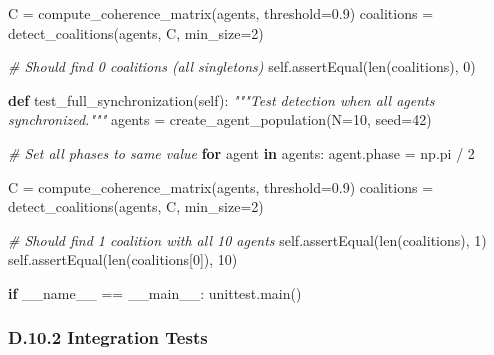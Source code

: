 \documentclass[
]{article}
\newenvironment{Shaded}{}{}
\newcommand{\BuiltInTok}[1]{\textcolor[rgb]{0.00,0.50,0.00}{#1}}
\newcommand{\CommentTok}[1]{\textcolor[rgb]{0.38,0.63,0.69}{\textit{#1}}}
\newcommand{\ControlFlowTok}[1]{\textcolor[rgb]{0.00,0.44,0.13}{\textbf{#1}}}
\newcommand{\DecValTok}[1]{\textcolor[rgb]{0.25,0.63,0.44}{#1}}
\newcommand{\FloatTok}[1]{\textcolor[rgb]{0.25,0.63,0.44}{#1}}
\newcommand{\KeywordTok}[1]{\textcolor[rgb]{0.00,0.44,0.13}{\textbf{#1}}}
\newcommand{\NormalTok}[1]{#1}
\newcommand{\OperatorTok}[1]{\textcolor[rgb]{0.40,0.40,0.40}{#1}}
\newcommand{\StringTok}[1]{\textcolor[rgb]{0.25,0.44,0.63}{#1}}
\newcommand{\VariableTok}[1]{\textcolor[rgb]{0.10,0.09,0.49}{#1}}
\begin{document}
\begin{Shaded}
\begin{Highlighting}[]
\NormalTok{        C }\OperatorTok{=}\NormalTok{ compute\_coherence\_matrix(agents, threshold}\OperatorTok{=}\FloatTok{0.9}\NormalTok{)}
\NormalTok{        coalitions }\OperatorTok{=}\NormalTok{ detect\_coalitions(agents, C, min\_size}\OperatorTok{=}\DecValTok{2}\NormalTok{)}

        \CommentTok{\# Should find 0 coalitions (all singletons)}
        \VariableTok{self}\NormalTok{.assertEqual(}\BuiltInTok{len}\NormalTok{(coalitions), }\DecValTok{0}\NormalTok{)}

    \KeywordTok{def}\NormalTok{ test\_full\_synchronization(}\VariableTok{self}\NormalTok{):}
        \CommentTok{"""Test detection when all agents synchronized."""}
\NormalTok{        agents }\OperatorTok{=}\NormalTok{ create\_agent\_population(N}\OperatorTok{=}\DecValTok{10}\NormalTok{, seed}\OperatorTok{=}\DecValTok{42}\NormalTok{)}

        \CommentTok{\# Set all phases to same value}
        \ControlFlowTok{for}\NormalTok{ agent }\KeywordTok{in}\NormalTok{ agents:}
\NormalTok{            agent.phase }\OperatorTok{=}\NormalTok{ np.pi }\OperatorTok{/} \DecValTok{2}

\NormalTok{        C }\OperatorTok{=}\NormalTok{ compute\_coherence\_matrix(agents, threshold}\OperatorTok{=}\FloatTok{0.9}\NormalTok{)}
\NormalTok{        coalitions }\OperatorTok{=}\NormalTok{ detect\_coalitions(agents, C, min\_size}\OperatorTok{=}\DecValTok{2}\NormalTok{)}

        \CommentTok{\# Should find 1 coalition with all 10 agents}
        \VariableTok{self}\NormalTok{.assertEqual(}\BuiltInTok{len}\NormalTok{(coalitions), }\DecValTok{1}\NormalTok{)}
        \VariableTok{self}\NormalTok{.assertEqual(}\BuiltInTok{len}\NormalTok{(coalitions[}\DecValTok{0}\NormalTok{]), }\DecValTok{10}\NormalTok{)}


\ControlFlowTok{if} \VariableTok{\_\_name\_\_} \OperatorTok{==} \StringTok{\textquotesingle{}\_\_main\_\_\textquotesingle{}}\NormalTok{:}
\NormalTok{    unittest.main()}
\end{Highlighting}
\end{Shaded}

\subsubsection{D.10.2 Integration Tests}\label{d.10.2-integration-tests}
\end{document}
